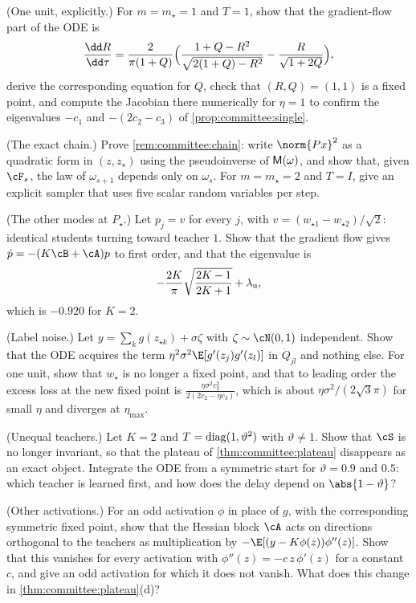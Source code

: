 \begin{refsection}
\begin{exercises}
\item \consolidation (One unit, explicitly.) For $m=m_\star=1$ and $T=1$, show that the gradient-flow part of the ODE is
\[
  \frac{\dd R}{\dd\tau}=\frac{2}{\pi(1+Q)}\Bigl(\frac{1+Q-R^2}{\sqrt{2(1+Q)-R^2}}-\frac{R}{\sqrt{1+2Q}}\Bigr),
\]
derive the corresponding equation for $Q$, check that $(R,Q)=(1,1)$ is a fixed point, and compute the Jacobian there numerically for $\eta=1$ to confirm the eigenvalues $-c_1$ and $-(2c_2-c_3)$ of \cref{prop:committee:single}.\label{ex:committee:one}

\item \consolidation (The exact chain.) Prove \cref{rem:committee:chain}: write $\norm{Px}^2$ as a quadratic form in $(z,z_\star)$ using the pseudoinverse of $\mathsf{M}(\omega)$, and show that, given $\cF_s$, the law of $\omega_{s+1}$ depends only on $\omega_s$. For $m=m_\star=2$ and $T=I$, give an explicit sampler that uses five scalar random variables per step.\label{ex:committee:chain}

\item \consolidation (The other modes at $P_\star$.) Let $p_j=v$ for every $j$, with $v=(w_{\star1}-w_{\star2})/\sqrt2$: identical students turning toward teacher $1$. Show that the gradient flow gives $\dot p=-(K\cB+\cA)p$ to first order, and that the eigenvalue is
\[
  -\frac{2K}\pi\sqrt{\frac{2K-1}{2K+1}}+\lambda_{\mathrm u},
\]
which is $-0.920$ for $K=2$.\label{ex:committee:modes}

\item \variation (Label noise.) Let $y=\sum_kg(z_{\star k})+\sigma\zeta$ with $\zeta\sim\cN(0,1)$ independent. Show that the ODE acquires the term $\eta^2\sigma^2\E[g'(z_j)g'(z_l)]$ in $\dot Q_{jl}$ and nothing else. For one unit, show that $w_\star$ is no longer a fixed point, and that to leading order the excess loss at the new fixed point is $\frac{\eta\sigma^2c_2^2}{2(2c_2-\eta c_3)}$, which is about $\eta\sigma^2/(2\sqrt3\pi)$ for small $\eta$ and diverges at $\eta_{\max}$.\label{ex:committee:noise}

\item \variation (Unequal teachers.) Let $K=2$ and $T=\operatorname{diag}(1,\vartheta^2)$ with $\vartheta\ne1$. Show that $\cS$ is no longer invariant, so that the plateau of \cref{thm:committee:plateau} disappears as an exact object. Integrate the ODE from a symmetric start for $\vartheta=0.9$ and $0.5$: which teacher is learned first, and how does the delay depend on $\abs{1-\vartheta}$?\label{ex:committee:unequal}

\item \variation (Other activations.) For an odd activation $\phi$ in place of $g$, with the corresponding symmetric fixed point, show that the Hessian block $\cA$ acts on directions orthogonal to the teachers as multiplication by $-\E[(y-K\phi(z))\phi''(z)]$. Show that this vanishes for every activation with $\phi''(z)=-c\,z\,\phi'(z)$ for a constant $c$, and give an odd activation for which it does not vanish. What does this change in \cref{thm:committee:plateau}(d)?\label{ex:committee:activation}


\end{exercises}
\end{refsection}
